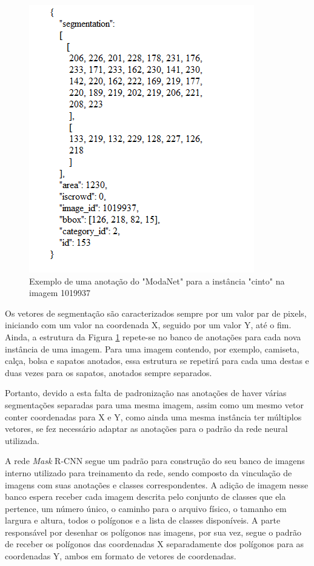 \documentclass[12pt]{report}
\begin{document}
\begin{figure}
    \centering
    \includegraphics[scale=0.8]{images/json-modanet.png}
    \caption{Exemplo de uma anotação do "ModaNet" para a instância "cinto" na imagem 1019937}
    \label{fig:json-modanet}
\end{figure}

Os vetores de segmentação são caracterizados sempre por um valor par de pixels, iniciando com um valor na coordenada X, seguido por um valor Y, até o fim. Ainda, a estrutura da Figura \ref{fig:json-modanet} repete-se no banco de anotações para cada nova instância de uma imagem. Para uma imagem contendo, por exemplo, camiseta, calça, bolsa e sapatos anotados, essa estrutura se repetirá para cada uma destas e duas vezes para os sapatos, anotados sempre separados. 

Portanto, devido a esta falta de padronização nas anotações de haver várias segmentações separadas para uma mesma imagem, assim como um mesmo vetor conter coordenadas para X e Y, como ainda uma mesma instância ter múltiplos vetores, se fez necessário adaptar as anotações para o padrão da rede neural utilizada. 

A rede \textit{Mask} R-CNN segue um padrão para construção do seu banco de imagens interno utilizado para treinamento da rede, sendo composto da vinculação de imagens com suas anotações e classes correspondentes. A adição de imagem nesse banco espera receber cada imagem descrita pelo conjunto de classes que ela pertence, um número único, o caminho para o arquivo físico, o tamanho em largura e altura, todos o polígonos e a lista de classes disponíveis. A parte responsável por desenhar os polígonos nas imagens, por sua vez, segue o padrão de receber os polígonos das coordenadas X separadamente dos polígonos para as coordenadas Y, ambos em formato de vetores de coordenadas. 
\end{document}
